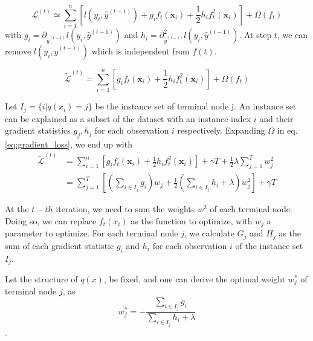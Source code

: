 \documentclass[12pt,a4paper]{article}
\begin{document}
\begin{equation}
\mathcal{L}^{(t)} \simeq \sum_{i=1}^{n}\left[l\left(y_{i}, \hat{y}^{(t-1)}\right)+g_{i} f_{t}\left(\mathbf{x}_{i}\right)+\frac{1}{2} h_{i} f_{t}^{2}\left(\mathbf{x}_{i}\right)\right]+\Omega\left(f_{t}\right)
\label{eq:gradient_loss}
\end{equation} with
\(g_{i}=\partial_{\hat{y}^{(t-1)}} l\left(y_{i}, \hat{y}^{(t-1)}\right)\) and \(h_{i}=\partial_{\hat{y}^{(t-1)}}^{2} l\left(y_{i}, \hat{y}^{(t-1)}\right)\).
At step \(t\), we can remove \(l\left(y_{i}, \hat{y}^{(t-1)}\right)\) which is independent from \(f(t)\).

\begin{equation}
\tilde{\mathcal{L}}^{(t)}=\sum_{i=1}^{n}\left[g_{i} f_{t}\left(\mathbf{x}_{i}\right)+\frac{1}{2} h_{i} f_{t}^{2}\left(\mathbf{x}_{i}\right)\right]+\Omega\left(f_{t}\right)
\end{equation}

Let \(I_j = \{i|q(x_i) = j\}\) be the instance set of terminal node j. An instance set can be explained as a subset of the dataset with an instance index \(i\) and their gradient statistics \(g_j,h_j\) for each observation \(i\) respectively. Expanding \(\Omega\) in eq. \ref{eq:gradient_loss}, we end up with
\begin{equation}
\begin{aligned}
\tilde{\mathcal{L}}^{(t)} &=\sum_{i=1}^{n}\left[g_{i} f_{t}\left(\mathbf{x}_{i}\right)+\frac{1}{2} h_{i} f_{t}^{2}\left(\mathbf{x}_{i}\right)\right]+\gamma T+\frac{1}{2} \lambda \sum_{j=1}^{T} w_{j}^{2} \\
&=\sum_{j=1}^{T}\left[\left(\sum_{i \in I_{j}} g_{i}\right) w_{j}+\frac{1}{2}\left(\sum_{i \in I_{j}} h_{i}+\lambda\right) w_{j}^{2}\right]+\gamma T
\label{eq:obj_weight}
\end{aligned}
\end{equation}

At the \(t-th\) iteration, we need to sum the weights \(w^2\) of each terminal node. Doing so, we can replace \(f_t(x_i)\) as the function to optimize, with \(w_j\) a parameter to optimize. For each terminal node \(j\), we calculate \(G_j\) and \(H_j\) as the sum of each gradient statistic \(g_i\) and \(h_i\) for each observation \(i\) of the instance set \(I_j\).

Let the structure of \(q(x)\), be fixed, and one can derive the optimal weight \(w^*_j\) of terminal node \(j\), as
\begin{equation}
w_{j}^{*}=-\frac{\sum_{i \in I_{j}} g_{i}}{\sum_{i \in I_{j}} h_{i}+\lambda}
\end{equation}.
\end{document}
